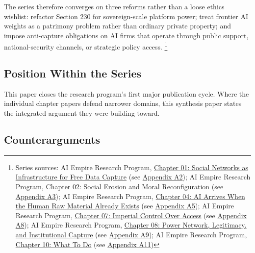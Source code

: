 \documentclass[
  american,
  11pt,
  letterpaper,
]{article}
\begin{document}
The series therefore converges on three reforms rather than a loose
ethics wishlist: refactor Section 230 for sovereign-scale platform
power; treat frontier AI weights as a patrimony problem rather than
ordinary private property; and impose anti-capture obligations on AI
firms that operate through public support, national-security channels,
or strategic policy access. \footnote{Series sources: AI Empire Research
  Program, \href{01_social-networks-data-capture_paper.html}{Chapter 01:
  Social Networks as Infrastructure for Free Data Capture} (see
  \hyperref[appendix-a2-chapter-01-social-networks-as-infrastructure-for-free-data-capture]{Appendix
  A2}); AI Empire Research Program,
  \href{02_social-erosion-and-moral-reconfiguration_paper.html}{Chapter
  02: Social Erosion and Moral Reconfiguration} (see
  \hyperref[appendix-a3-chapter-02-social-erosion-and-moral-reconfiguration]{Appendix
  A3}); AI Empire Research Program,
  \href{04_data-models-weights_paper.html}{Chapter 04: AI Arrives When
  the Human Raw Material Already Exists} (see
  \hyperref[appendix-a5-chapter-04-ai-arrives-when-the-human-raw-material-already-exists]{Appendix
  A5}); AI Empire Research Program,
  \href{07_imperial-control-over-access_paper.html}{Chapter 07: Imperial
  Control Over Access} (see
  \hyperref[appendix-a8-chapter-07-imperial-control-over-access]{Appendix
  A8}); AI Empire Research Program,
  \href{08_legitimacy-and-institutional-capture_paper.html}{Chapter 08:
  Power Network, Legitimacy, and Institutional Capture} (see
  \hyperref[appendix-a9-chapter-08-power-network-legitimacy-and-institutional-capture]{Appendix
  A9}); AI Empire Research Program,
  \href{10_three-reform-program_paper.html}{Chapter 10: What To Do} (see
  \hyperref[appendix-a11-chapter-10-what-to-do]{Appendix A11})}

\subsection{Position Within the
Series}\label{position-within-the-series}

This paper closes the research program's first major publication cycle.
Where the individual chapter papers defend narrower domains, this
synthesis paper states the integrated argument they were building
toward.

\subsection{Counterarguments}\label{counterarguments}
\end{document}
